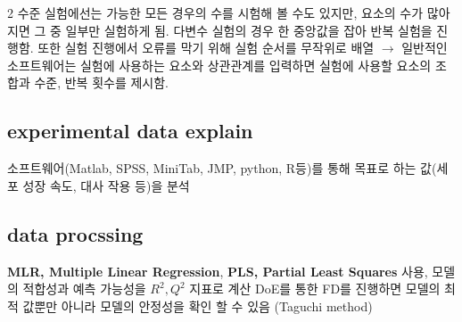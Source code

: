 \documentclass{article}
\begin{document}
2 수준 실험에선는 가능한 모든 경우의 수를 시험해 볼 수도 있지만, 요소의 수가 많아지면 그 중 일부만 실험하게 됨. 다변수 실험의 경우 한 중앙값을 잡아 반복 실험을 진행함. 또한 실험 진행에서 오류를 막기 위해 실험 순서를 무작위로 배열 $\rightarrow$ 일반적인 소프트웨어는 실험에 사용하는 요소와 상관관계를 입력하면 실험에 사용할 요소의 조합과 수준, 반복 횟수를 제시함.
\subsection{experimental data explain}
소프트웨어(Matlab, SPSS, MiniTab, JMP, python, R등)를 통해 목표로 하는 값(세포 성장 속도, 대사 작용 등)을 분석
\subsection{data procssing}
\textbf{MLR, Multiple Linear Regression}, \textbf{PLS, Partial Least Squares} 사용,
모델의 적합성과 예측 가능성을 $R^2,Q^2$ 지표로 계산 DoE를 통한 FD를 진행하면 모델의 최적 값뿐만 아니라 모델의 안정성을 확인 할 수 있음 (Taguchi method)
\end{document}
